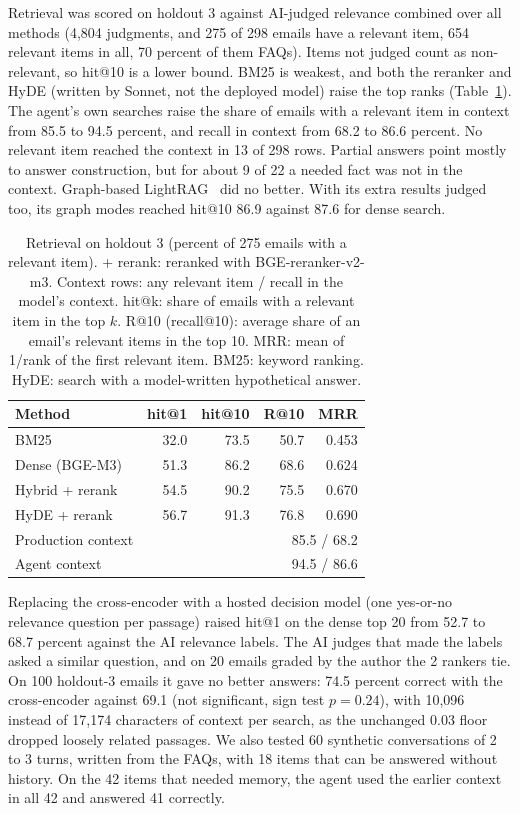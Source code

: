 \documentclass[a4paper,10pt,twocolumn]{article}
\begin{document}
Retrieval was scored on holdout 3 against AI-judged relevance combined over all methods (4,804 judgments, and 275 of 298 emails have a relevant item, 654 relevant items in all, 70 percent of them FAQs). Items not judged count as non-relevant, so hit@10 is a lower bound. BM25 is weakest, and both the reranker and HyDE (written by Sonnet, not the deployed model) raise the top ranks (Table~\ref{tab:recall}). The agent's own searches raise the share of emails with a relevant item in context from 85.5 to 94.5 percent, and recall in context from 68.2 to 86.6 percent. No relevant item reached the context in 13 of 298 rows. Partial answers point mostly to answer construction, but for about 9 of 22 a needed fact was not in the context. Graph-based LightRAG~\cite{guo2024lightrag} did no better. With its extra results judged too, its graph modes reached hit@10 86.9 against 87.6 for dense search.

\begin{table}[t]
\centering\footnotesize
\setlength{\tabcolsep}{4pt}
\caption{Retrieval on holdout 3 (percent of 275 emails with a relevant item). + rerank: reranked with BGE-reranker-v2-m3. Context rows: any relevant item / recall in the model's context. hit@k: share of emails with a relevant item in the top $k$. R@10 (recall@10): average share of an email's relevant items in the top 10. MRR: mean of 1/rank of the first relevant item. BM25: keyword ranking. HyDE: search with a model-written hypothetical answer.}\label{tab:recall}
\begin{tabular}{@{}lrrrr@{}}
\toprule
Method & hit@1 & hit@10 & R@10 & MRR\\
\midrule
BM25 & 32.0 & 73.5 & 50.7 & 0.453\\
Dense (BGE-M3) & 51.3 & 86.2 & 68.6 & 0.624\\
Hybrid + rerank & 54.5 & 90.2 & 75.5 & 0.670\\
HyDE + rerank & 56.7 & 91.3 & 76.8 & 0.690\\
\midrule
Production context & \multicolumn{4}{r}{85.5 / 68.2}\\
Agent context & \multicolumn{4}{r}{94.5 / 86.6}\\
\bottomrule
\end{tabular}
\end{table}

Replacing the cross-encoder with a hosted decision model (one yes-or-no relevance question per passage) raised hit@1 on the dense top 20 from 52.7 to 68.7 percent against the AI relevance labels. The AI judges that made the labels asked a similar question, and on 20 emails graded by the author the 2 rankers tie. On 100 holdout-3 emails it gave no better answers: 74.5 percent correct with the cross-encoder against 69.1 (not significant, sign test $p=0.24$), with 10,096 instead of 17,174 characters of context per search, as the unchanged 0.03 floor dropped loosely related passages. We also tested 60 synthetic conversations of 2 to 3 turns, written from the FAQs, with 18 items that can be answered without history. On the 42 items that needed memory, the agent used the earlier context in all 42 and answered 41 correctly.
\end{document}
